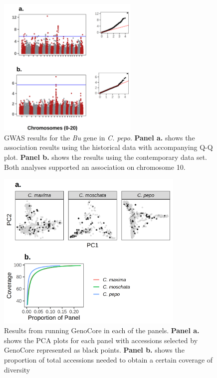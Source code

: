 \documentclass[utf8]{FrontiersinHarvard} %
\begin{document}
\clearpage

\begin{figure}[h]
	\begin{center}
		\includegraphics[width=0.6\textwidth]{../final_figures/08_fig.png}
	\end{center}
	\caption{GWAS results for the \textit{Bu} gene in \textit{C. pepo}. \textbf{Panel a.} shows the association results using the historical data with accompanying Q-Q plot. \textbf{Panel b.} shows the results using the contemporary data set. Both analyses supported an association on chromosome 10. \label{fig:8}}
\end{figure}

\clearpage

\begin{figure}[h]
	\begin{center}
		\includegraphics[width=0.8\textwidth]{../final_figures/09_fig.png}
	\end{center}
	\caption{Results from running GenoCore in each of the panels. {\color{red}\textbf{Panel a.}} shows the PCA plots for each panel with accessions selected by GenoCore represented as black points. {\color{red}\textbf{Panel b.}} shows the proportion of total accessions needed to obtain a certain coverage of diversity \label{fig:9}}
\end{figure}
\end{document}
